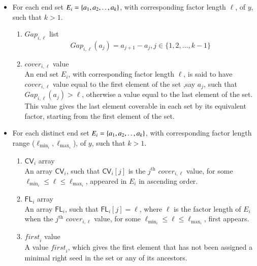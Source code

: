 \documentclass[preprint,12pt]{elsarticle}
\newcommand{\dd}{\mathinner{\ldotp\ldotp}}
\newcommand{\cv}{\textsf{CV}}
\newcommand{\fl}{\textsf{FL}}
\newcommand{\gaplist}{\ensuremath{\mathit{Gap}}}
\newcommand{\covervalue}{\ensuremath{\mathit{cover}}}
\newcommand{\firstvalue}{\ensuremath{\mathit{first}}}
\begin{document}
\begin{itemize}
 \item For each end set $E_{i}=\{a_{1},a_{2}, \dd ,a_{k}\}$, with corresponding factor length $\ell$, of $y$, such that $k>1$.

\begin{enumerate}
  \item $\gaplist_{i,\ell}$ list\\
      \begin{equation}\gaplist_{i,\ell}(a_{j})= a_{j+1}-a_{j}, j\in\{1, 2, \ldots , k-1\}\end{equation}
  \item $\covervalue_{i,\ell}$ value\\
  An end set $E_{i}$, with corresponding factor length $\ell$, is said to have $\covervalue_{i,\ell}$ value equal to the first element of
  the set ,say $a_j$, such that $\gaplist_{i,\ell}(a_j) > \ell$, otherwise a value equal to the last element of the set. This value gives the last element coverable in each set by its equivalent
  factor, starting from the first element of the set.
  \end{enumerate}

\item For each distinct end set $E_{i}=\{a_{1},a_{2}, \dd ,a_{k}\}$, with corresponding factor length range ($\ell_{\min_{i}}, \ell_{\max_{i}}$), of $y$, such that $k>1$.
\begin{enumerate}
\item $\cv_i$ array\\
 An array $\cv_i$, such that $\cv_i[j]$ is the $j^{\text{th}}$ $\covervalue_{i,\ell}$ value, 
for some $\ell_{\min_{i}} \leq \ell \leq \ell_{\max_{i}}$, appeared in $E_{i}$ in ascending order.
  \item $\fl_i$ array\\
   An array $\fl_i$, such that $\fl_i[j]=\ell$, where $\ell$ is the factor length of $E_{i}$ when the
$j^{\text{th}}$ $\covervalue_{i,\ell}$ value, for some $\ell_{\min_{i}} \leq \ell \leq \ell_{\max_{i}}$, first appears.
  \item $\firstvalue_i$ value\\
  A value $\firstvalue_i$, which gives the first element that has not been assigned a minimal right seed in the set or any of its ancestors.
\end{enumerate}

\end{itemize}
\end{document}
